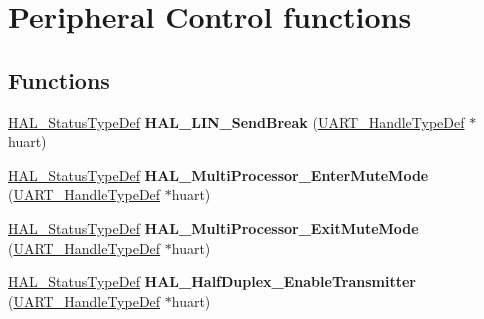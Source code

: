 \hypertarget{group___u_a_r_t___exported___functions___group3}{\section{Peripheral Control functions}
\label{group___u_a_r_t___exported___functions___group3}
}
\subsection*{Functions}
\begin{DoxyCompactItemize}
\item 
\hypertarget{group___u_a_r_t___exported___functions___group3_gaffbf11fb4929f709004a11675cd25fcf}{\hyperlink{stm32l1xx__hal__def_8h_a63c0679d1cb8b8c684fbb0632743478f}{H\-A\-L\-\_\-\-Status\-Type\-Def} {\bfseries H\-A\-L\-\_\-\-L\-I\-N\-\_\-\-Send\-Break} (\hyperlink{struct_u_a_r_t___handle_type_def}{U\-A\-R\-T\-\_\-\-Handle\-Type\-Def} $\ast$huart)}\label{group___u_a_r_t___exported___functions___group3_gaffbf11fb4929f709004a11675cd25fcf}

\item 
\hypertarget{group___u_a_r_t___exported___functions___group3_ga659637545299b91d2a77dadaf7266bf2}{\hyperlink{stm32l1xx__hal__def_8h_a63c0679d1cb8b8c684fbb0632743478f}{H\-A\-L\-\_\-\-Status\-Type\-Def} {\bfseries H\-A\-L\-\_\-\-Multi\-Processor\-\_\-\-Enter\-Mute\-Mode} (\hyperlink{struct_u_a_r_t___handle_type_def}{U\-A\-R\-T\-\_\-\-Handle\-Type\-Def} $\ast$huart)}\label{group___u_a_r_t___exported___functions___group3_ga659637545299b91d2a77dadaf7266bf2}

\item 
\hypertarget{group___u_a_r_t___exported___functions___group3_ga81b90fb3a4d7a8601a92260edbd3422f}{\hyperlink{stm32l1xx__hal__def_8h_a63c0679d1cb8b8c684fbb0632743478f}{H\-A\-L\-\_\-\-Status\-Type\-Def} {\bfseries H\-A\-L\-\_\-\-Multi\-Processor\-\_\-\-Exit\-Mute\-Mode} (\hyperlink{struct_u_a_r_t___handle_type_def}{U\-A\-R\-T\-\_\-\-Handle\-Type\-Def} $\ast$huart)}\label{group___u_a_r_t___exported___functions___group3_ga81b90fb3a4d7a8601a92260edbd3422f}

\item 
\hypertarget{group___u_a_r_t___exported___functions___group3_ga58d73e260a5536fb9cb40d7d2fe2b4bb}{\hyperlink{stm32l1xx__hal__def_8h_a63c0679d1cb8b8c684fbb0632743478f}{H\-A\-L\-\_\-\-Status\-Type\-Def} {\bfseries H\-A\-L\-\_\-\-Half\-Duplex\-\_\-\-Enable\-Transmitter} (\hyperlink{struct_u_a_r_t___handle_type_def}{U\-A\-R\-T\-\_\-\-Handle\-Type\-Def} $\ast$huart)}\label{group___u_a_r_t___exported___functions___group3_ga58d73e260a5536fb9cb40d7d2fe2b4bb}


\end{DoxyCompactItemize}
